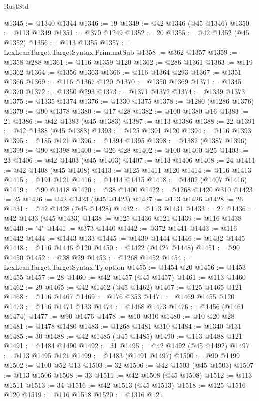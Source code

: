 \begin{lexlean}{RustStd}
\begin{coremodule}
@1345 := @1340 @1344
@1346 := 19
@1349 := @42 @1346 (@45 @1346)
@1350 := @113 @1349
@1351 := @370 @1249
@1352 := 20
@1355 := @42 @1352 (@45 @1352)
@1356 := @113 @1355
@1357 := LexLeanTarget.TargetSyntax.Prim.natSub
@1358 := @362 @1357
@1359 := @1358 @288
@1361 := @116 @1359 @120
@1362 := @286 @1361
@1363 := @119 @1362
@1364 := @1356 @1363
@1366 := @116 @1364 @293
@1367 := @1351 @1366
@1369 := @116 @1367 @120
@1370 := @1350 @1369
@1371 := @1345 @1370
@1372 := @1350 @293
@1373 := @1371 @1372
@1374 := @1339 @1373
@1375 := @1335 @1374
@1376 := @1330 @1375
@1378 := @1280 (@1286 @1376)
@1379 := @90 @1378
@1380 := @17 @28
@1382 := @100 @1380 @16
@1383 := 21
@1386 := @42 @1383 (@45 @1383)
@1387 := @113 @1386
@1388 := 22
@1391 := @42 @1388 (@45 @1388)
@1393 := @125 @1391 @120
@1394 := @116 @1393
@1395 := @185 @121
@1396 := @1394 @1395
@1398 := @1382 (@1387 @1396)
@1399 := @90 @1398
@1400 := @26 @28
@1402 := @100 @1400 @25
@1403 := 23
@1406 := @42 @1403 (@45 @1403)
@1407 := @113 @1406
@1408 := 24
@1411 := @42 @1408 (@45 @1408)
@1413 := @125 @1411 @120
@1414 := @116 @1413
@1415 := @191 @121
@1416 := @1414 @1415
@1418 := @1402 (@1407 @1416)
@1419 := @90 @1418
@1420 := @38 @1400
@1422 := @1268 @1420 @310
@1423 := 25
@1426 := @42 @1423 (@45 @1423)
@1427 := @113 @1426
@1428 := 26
@1431 := @42 @1428 (@45 @1428)
@1432 := @113 @1431
@1433 := 27
@1436 := @42 @1433 (@45 @1433)
@1438 := @125 @1436 @121
@1439 := @116 @1438
@1440 := "4"
@1441 := @373 @1440
@1442 := @372 @1441
@1443 := @116 @1442
@1444 := @1443 @133
@1445 := @1439 @1444
@1446 := @1432 @1445
@1448 := @116 @1446 @120
@1450 := @1422 (@1427 @1448)
@1451 := @90 @1450
@1452 := @38 @29
@1453 := @1268 @1452
@1454 := LexLeanTarget.TargetSyntax.Ty.option
@1455 := @1454 @20
@1456 := @1453 @1455
@1457 := 28
@1460 := @42 @1457 (@45 @1457)
@1461 := @113 @1460
@1462 := 29
@1465 := @42 @1462 (@45 @1462)
@1467 := @125 @1465 @121
@1468 := @116 @1467
@1469 := @176 @353
@1471 := @1469 @1455 @120
@1473 := @116 @1471 @133
@1474 := @1468 @1473
@1476 := @1456 (@1461 @1474)
@1477 := @90 @1476
@1478 := @10 @310
@1480 := @10 @20 @28
@1481 := @1478 @1480
@1483 := @1268 @1481 @310
@1484 := @1340 @131
@1485 := 30
@1488 := @42 @1485 (@45 @1485)
@1490 := @113 @1488 @121
@1491 := @1484 @1490
@1492 := 31
@1495 := @42 @1492 (@45 @1492)
@1497 := @113 @1495 @121
@1499 := @1483 (@1491 @1497)
@1500 := @90 @1499
@1502 := @100 @52 @13
@1503 := 32
@1506 := @42 @1503 (@45 @1503)
@1507 := @113 @1506
@1508 := 33
@1511 := @42 @1508 (@45 @1508)
@1512 := @113 @1511
@1513 := 34
@1516 := @42 @1513 (@45 @1513)
@1518 := @125 @1516 @120
@1519 := @116 @1518
@1520 := @1316 @121

\end{coremodule}
\end{lexlean}
